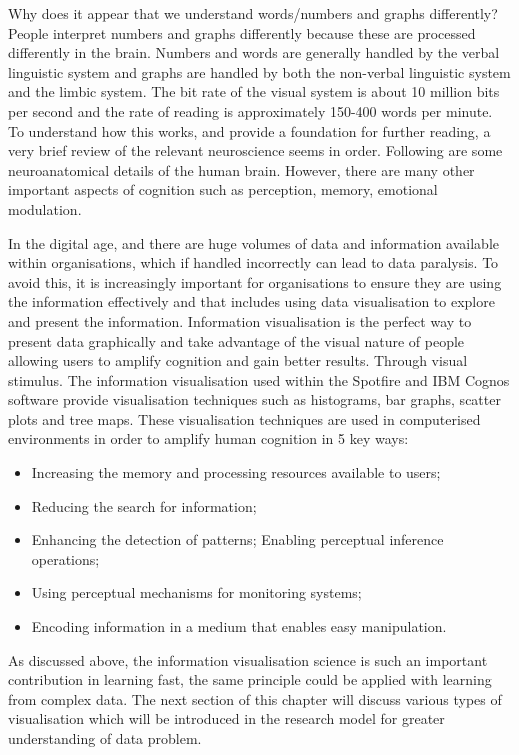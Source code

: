 Why does it appear that we understand words/numbers and graphs differently? People interpret numbers and graphs differently because these are processed differently in the brain. Numbers and words are generally handled by the verbal linguistic system and graphs are handled by both the non-verbal linguistic system and the limbic system. The bit rate of the visual system is about 10 million bits per second \cite{koch2006much} and the rate of reading is approximately 150-400 words per minute. To understand how this works, and provide a foundation for further reading, a very brief review of the relevant neuroscience seems in order. Following are some neuroanatomical details of the human brain. However, there are many other important aspects of cognition such as perception, memory, emotional modulation.

In the digital age, and there are huge volumes of data and information available within organisations, which if handled incorrectly can lead to data paralysis. To avoid this, it is increasingly important for organisations to ensure they are using the information effectively and that includes using data visualisation to explore and present the information. Information visualisation is the perfect way to present data graphically and take advantage of the visual nature of people allowing users to amplify cognition and gain better results. Through visual stimulus. The information visualisation used within the Spotfire \cite{koch2006much} and IBM Cognos software \cite{ibmcognos} provide visualisation techniques such as histograms, bar graphs, scatter plots and tree maps. These visualisation techniques are used in computerised environments in order to amplify human cognition in 5 key ways:
\begin{itemize}
\item  Increasing the memory and processing resources  available to users;
\item  Reducing the search for information;   
\item  Enhancing the detection of patterns;   Enabling perceptual inference operations; 
\item  Using perceptual mechanisms for monitoring  systems;   
\item  Encoding information in a medium that enables  easy manipulation.  
\end{itemize}

As discussed above, the information visualisation science is such an important contribution in learning fast, the same principle could be applied with learning from complex data. The next section of this chapter will discuss various types of visualisation which will be introduced in the research model for greater understanding of data problem.

